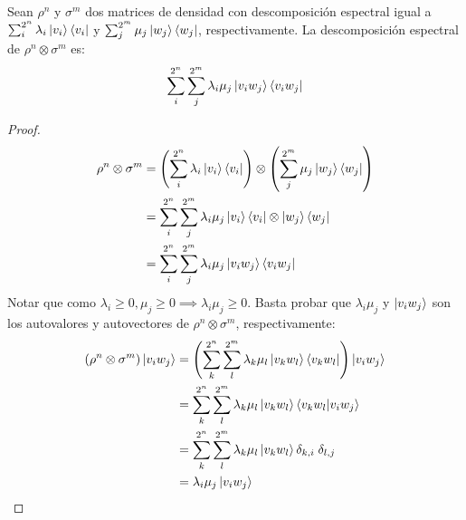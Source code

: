 \begin{lema}\label{lem:esp_otimes}
    Sean $\rho^n$ y $\sigma^m$ dos matrices de densidad con descomposición espectral igual a $\sum_i^{2^n} \lambda_i \ket{v_i}\bra{v_i}$ y \newline
    $\sum_j^{2^m} \mu_j \ket{w_j}\bra{w_j}$, respectivamente.
    La descomposición espectral de $\rho^n \otimes \sigma^m$ es:
    \[\sum_i^{2^n}\sum_j^{2^m} \lambda_i  \mu_j \ket{v_iw_j}\bra{v_iw_j}\]
\end{lema}
\begin{proof}
\begin{align*}
    \rho^n \otimes \sigma^m &=  \left(\sum_i^{2^n} \lambda_i \ket{v_i}\bra{v_i}\right)\otimes\left(\sum_j^{2^m} \mu_j \ket{w_j}\bra{w_j}\right) \\
    &= \sum_i^{2^n}\sum_j^{2^m} \lambda_i \mu_j \ket{v_i}\bra{v_i}\otimes \ket{w_j}\bra{w_j} \\
    &= \sum_i^{2^n}\sum_j^{2^m} \lambda_i \mu_j \ket{v_iw_j}\bra{v_iw_j}
\end{align*}
Notar que como $\lambda_i\geq 0,  \mu_j\geq 0 \implies \lambda_i \mu_j\geq 0$.
Basta probar que $\lambda_i \mu_j$ y $\ket{v_iw_j}$ son los autovalores y autovectores de $\rho^n \otimes \sigma^m$, respectivamente:
\begin{align*}
    (\rho^n \otimes \sigma^m) \ket{v_iw_j} &= \left(\sum_k^{2^n}\sum_l^{2^m} \lambda_k \mu_l \ket{v_kw_l}\bra{v_kw_l}\right) \ket{v_iw_j} \\
    &= \sum_k^{2^n}\sum_l^{2^m} \lambda_k \mu_l \ket{v_kw_l}\braket{v_kw_l|v_iw_j} \\
    &= \sum_k^{2^n}\sum_l^{2^m} \lambda_k \mu_l \ket{v_kw_l}\delta_{k,i}\;\delta_{l,j}\\
    &= \lambda_i \mu_j \ket{v_iw_j}
\end{align*}
\end{proof}

